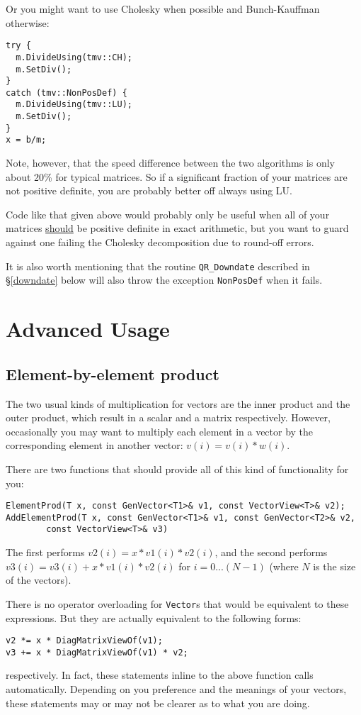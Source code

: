 \documentclass[twoside,letterpaper,11pt]{article}
\renewcommand{\tt}[1]{{\texttt {#1}}}
\begin{document}
\begin{itemize}
Or you might want to use Cholesky when possible and Bunch-Kauffman otherwise:
\begin{verbatim}
try {
  m.DivideUsing(tmv::CH);
  m.SetDiv();
}
catch (tmv::NonPosDef) {
  m.DivideUsing(tmv::LU);
  m.SetDiv();
}
x = b/m;
\end{verbatim}

Note, however, that the speed difference between the two algorithms is only about
20\% for typical matrices.  So if a significant fraction of your matrices are 
not positive definite, you are probably better off always using LU.  

Code like that given above would probably only be useful when all of your 
matrices \underline{should} be positive definite in exact arithmetic, but you 
want to guard against one failing the Cholesky decomposition due to round-off
errors.

It is also worth mentioning that the routine \tt{QR\_Downdate} described in \S\ref{downdate}
below will also throw the exception \tt{NonPosDef} when it fails.

\end{itemize}

\newpage
\section{Advanced Usage}

\subsection{Element-by-element product}

The two usual kinds of multiplication for vectors are the inner product and 
the outer product, which result in a scalar and a matrix respectively.
However, occasionally you may want to multiply each element in a vector by the
corresponding element in another vector: $v(i) = v(i) * w(i)$.

There are two functions that should provide all of this kind of functionality
for you:
\begin{verbatim}
ElementProd(T x, const GenVector<T1>& v1, const VectorView<T>& v2);
AddElementProd(T x, const GenVector<T1>& v1, const GenVector<T2>& v2,
        const VectorView<T>& v3)
\end{verbatim}
The first performs $v2(i) = x * v1(i) * v2(i)$, and the second performs
$v3(i) = v3(i) + x * v1(i) * v2(i)$ for $i = 0 ... (N-1)$ (where $N$ is the 
size of the vectors).

There is no operator overloading for \tt{Vector}s that would be equivalent to 
these expressions.
But they are actually equivalent to the following forms:
\begin{verbatim}
v2 *= x * DiagMatrixViewOf(v1);
v3 += x * DiagMatrixViewOf(v1) * v2;
\end{verbatim}
respectively.  In fact, these statements inline to the above function calls
automatically.  Depending on you preference and the meanings of your vectors,
these statements may or may not be clearer as to what you are doing.
\end{document}
